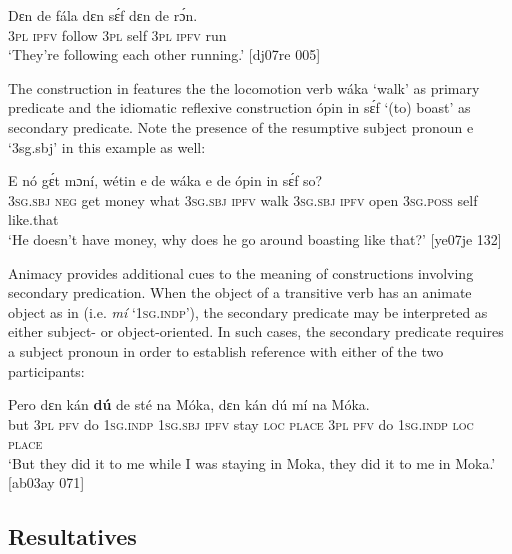 \ea%
    \label{ex:key:1599}
    \gll Dɛn  de  fála    dɛn  sɛ́f  dɛn  de  rɔ́n.\\
\textsc{3pl}  \textsc{ipfv}  follow  \textsc{3pl}  self  \textsc{3pl}  \textsc{ipfv}  run\\

\glt ‘They’re following each other running.’ [dj07re 005]
\z

The construction in  features the the locomotion verb wáka ‘walk’ as primary predicate and the idiomatic reflexive construction ópin in sɛ́f ‘(to) boast’ as secondary predicate. Note the presence of the resumptive subject{\fff} pronoun e ‘3sg.sbj’ in this example as well: 


\ea%
    \label{ex:key:1600}
    \gll E    nó  gɛ́t  mɔní,  wétin  e    de  wáka
e    de  ópin  in    sɛ́f  so?\\
\textsc{3sg.sbj}  \textsc{neg}  get  money  what  \textsc{3sg.sbj}  \textsc{ipfv}  walk
\textsc{3sg.sbj}  \textsc{ipfv}  open  \textsc{3sg.poss}  self  like.that\\

\glt ‘He doesn’t have money, why does he go around boasting like that?’ [ye07je 132]
\z

Animacy provides additional cues to the meaning of constructions involving secondary predication. When the object of a transitive verb has an animate object as in  (i.e. \textit{mí} ‘\textsc{1sg.indp’),} the secondary predicate may be interpreted as either subject- or object-oriented. In such cases, the secondary predicate requires a subject pronoun in order to establish reference with either of the two participants:


\ea%
    \label{ex:key:1601}
    \gll Pero    dɛn  kán  \textbf{dú}          de  sté  na  Móka,  
dɛn  kán  dú  mí    na  Móka.\\
but    \textsc{3pl}  \textsc{pfv}  do  \textsc{1sg.indp}  \textsc{1sg.sbj}  \textsc{ipfv}  stay  \textsc{loc}  \textsc{place}  
\textsc{3pl}  \textsc{pfv}  do  \textsc{1sg.indp}  \textsc{loc}  \textsc{place}\\

\glt ‘But they did it to me while I was staying in Moka, they did it to 
me in Moka.’ [ab03ay 071]
\z

\subsection{Resultatives}\label{sec:11.3.3}

